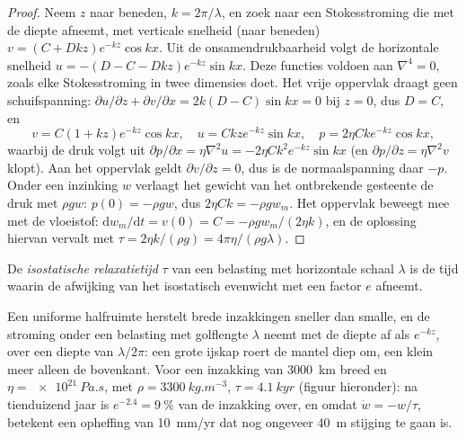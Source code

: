\begin{proof}
Neem $z$ naar beneden, $k = 2\pi/\lambda$, en zoek naar een Stokesstroming die
met de diepte afneemt, met verticale snelheid (naar beneden) $v = (C + Dkz)e^{-kz}\cos kx$.
Uit de onsamendrukbaarheid volgt de horizontale snelheid $u = -(D - C - Dkz)e^{-kz}\sin
kx$. Deze functies voldoen aan $\nabla^4 = 0$, zoals elke Stokesstroming in twee
dimensies doet. Het vrije oppervlak draagt geen schuifspanning: $\partial u/\partial
z + \partial v/\partial x = 2k(D - C)\sin kx = 0$ bij $z = 0$, dus $D = C$, en
\[
  v = C(1 + kz)e^{-kz}\cos kx,\quad u = Ckze^{-kz}\sin kx,\quad
  p = 2\eta Cke^{-kz}\cos kx,
\]
waarbij de druk volgt uit $\partial p/\partial x = \eta\nabla^2u = -2\eta
Ck^2e^{-kz}\sin kx$ (en $\partial p/\partial z = \eta\nabla^2v$ klopt). Aan het
oppervlak geldt $\partial v/\partial z = 0$, dus is de normaalspanning daar $-p$. Onder
een inzinking $w$ verlaagt het gewicht van het ontbrekende gesteente de druk met $\rho
gw$: $p(0) = -\rho gw$, dus $2\eta Ck = -\rho gw_m$. Het oppervlak beweegt mee met de
vloeistof: $\mathrm dw_m/\mathrm dt = v(0) = C = -\rho gw_m/(2\eta k)$, en de
oplossing hiervan vervalt met $\tau = 2\eta k/(\rho g) = 4\pi\eta/(\rho g\lambda)$.
\end{proof}

\begin{definition}\label{def:b3:mantle-convection:relaxation-time}
De \emph{isostatische relaxatietijd} $\tau$ van
een belasting met horizontale schaal $\lambda$ is de tijd waarin de afwijking van
het isostatisch evenwicht met een factor $e$ afneemt.
\end{definition}

Een uniforme halfruimte herstelt brede inzakkingen sneller dan smalle, en de
stroming onder een belasting met golflengte $\lambda$ neemt met de diepte af als $e^{-kz}$, over
een diepte van $\lambda/2\pi$: een grote ijskap roert de mantel diep om, een klein meer
alleen de bovenkant. Voor een inzakking van \qty{3000}{km} breed en $\eta =
\qty{e21}{Pa.s}$, met $\rho = \qty{3300}{kg.m^{-3}}$, $\tau = \qty{4.1}{kyr}$
(figuur hieronder): na tienduizend jaar is $e^{-2.4} = \qty{9}{\percent}$ van de
inzakking over, en omdat $\dot w = -w/\tau$, betekent een opheffing van
\qty{10}{mm/yr} dat nog ongeveer \qty{40}{m} stijging te gaan is.

